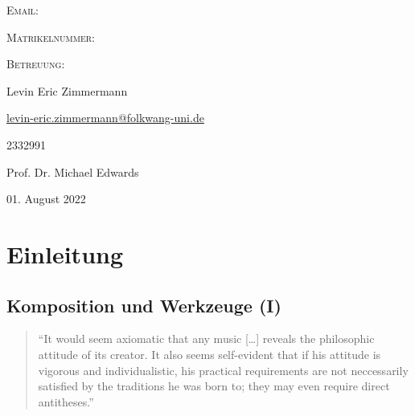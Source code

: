 \documentclass[12pt,a4paper,ngerman]{article}
\newcommand{\mailto}[1]{\href{mailto:#1}{#1}}
\begin{document}
\begin{titlepage}
\begin{minipage}[b]{.25\textwidth}
\begin{flushleft}
\textsc{Email:}

\textsc{Matrikelnummer:}

\textsc{Betreuung:}
\end{flushleft}
\end{minipage}%
\begin{minipage}[b]{.5\textwidth}
\begin{flushleft}
Levin Eric Zimmermann %

{\normalsize \mailto{levin-eric.zimmermann@folkwang-uni.de}}

2332991

Prof. Dr. Michael Edwards
\end{flushleft}
\end{minipage}

\vspace{2cm}



{\large 01. August 2022}\\[2cm] %

\vfill %

\end{titlepage}

\newpage


{
    \tableofcontents
}


\newpage



\section{Einleitung}

\subsection{Komposition und Werkzeuge (I)}

\begin{quote}
    ``It would seem axiomatic that any music [\dots] reveals the philosophic attitude of its creator.
    It also seems self-evident that if his attitude is vigorous and individualistic, his practical requirements are not neccessarily satisfied by the traditions he was born to;
    they may even require direct antitheses.''~\parencite[S. 3]{genesisOfMusic}
\end{quote}
\end{document}
